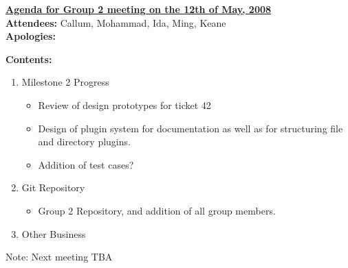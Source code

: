 \documentclass{letter}
\begin{document}
{\large \textbf{\underline{Agenda for Group 2 meeting on the 12th of May, 2008}}}\\

\textbf{Attendees:} Callum, Mohammad, Ida, Ming, Keane\\
\textbf{Apologies:}

\textbf{Contents:}

\begin{enumerate}
\item Milestone 2 Progress
	\begin{itemize}
	\item Review of design prototypes for ticket 42
	\item Design of plugin system for documentation as well as for structuring file and directory plugins.
	\item Addition of test cases?
	\end{itemize}
\item Git Repository
	\begin{itemize}
	\item Group 2 Repository, and addition of all group members.
	\end{itemize}
\item Other Business
\end{enumerate}
 
Note: Next meeting TBA
\end{document}
